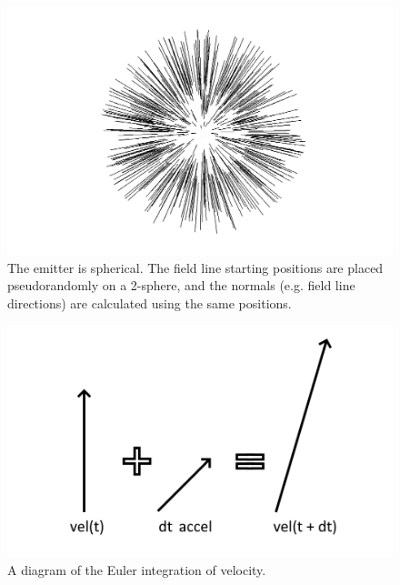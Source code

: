 \documentclass[12pt]{article}
\begin{document}
\begin{figure} 
\centering
  \includegraphics[width = 6 in]{3.png}
  \caption{
The emitter is spherical.
The field line starting positions are placed pseudorandomly on a 2-sphere, and the normals (e.g. field line directions) are calculated using the same positions.
}
\end{figure}







\begin{figure} 
\centering
\label{fig3}
  \includegraphics[width = 6 in]{velocity.png}
  \caption{
A diagram of the Euler integration of velocity.
}
\end{figure}
\end{document}
